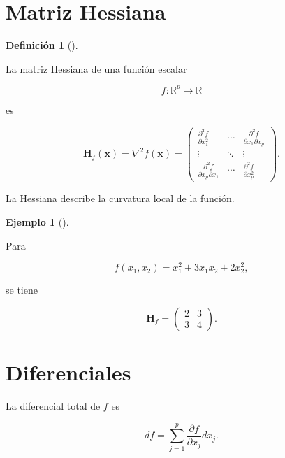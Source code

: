 \documentclass[
  spanish,
  10.5pt,
  letterpaper,
  DIV=11,
  numbers=noendperiod,
  oneside,
  open=any]{scrreprt}
\theoremstyle{definition}
\newtheorem{definition}{Definición}[chapter]
\theoremstyle{definition}
\newtheorem{example}{Ejemplo}[chapter]
\theoremstyle{plain}
\theoremstyle{remark}
\begin{document}
\section*{Matriz Hessiana}\label{matriz-hessiana}


\begin{definition}[]\protect\hypertarget{def-hessiana}{}\label{def-hessiana}

La matriz Hessiana de una función escalar

\[
f:\mathbb{R}^{p}\to\mathbb{R}
\]

es

\[
\mathbf{H}_f(\mathbf{x})
=
\nabla^2f(\mathbf{x})
=
\begin{pmatrix}
\frac{\partial^2 f}{\partial x_1^2}
&
\cdots
&
\frac{\partial^2 f}{\partial x_1\partial x_p}
\\
\vdots
&
\ddots
&
\vdots
\\
\frac{\partial^2 f}{\partial x_p\partial x_1}
&
\cdots
&
\frac{\partial^2 f}{\partial x_p^2}
\end{pmatrix}.
\]

\end{definition}

La Hessiana describe la curvatura local de la función.

\begin{example}[]\protect\hypertarget{exm-hessiana}{}\label{exm-hessiana}

Para

\[
f(x_1,x_2)
=
x_1^2+3x_1x_2+2x_2^2,
\]

se tiene

\[
\mathbf{H}_f
=
\begin{pmatrix}
2 & 3\\
3 & 4
\end{pmatrix}.
\]

\end{example}

\section*{Diferenciales}\label{diferenciales}


La diferencial total de \(f\) es

\[
df
=
\sum_{j=1}^{p}
\frac{\partial f}{\partial x_j}
dx_j.
\]
\end{document}
